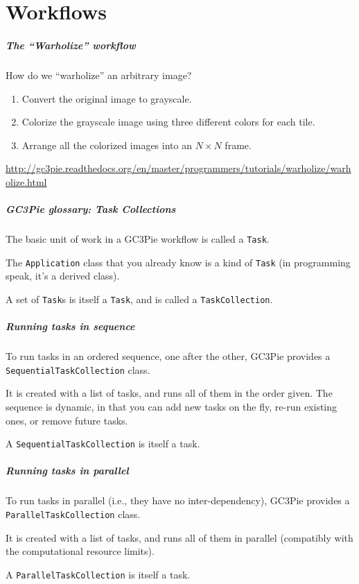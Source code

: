 \documentclass[english,serif,mathserif,usenames,dvipsnames]{beamer}
\begin{document}
\part{Workflows}

\begin{frame}[label=workflows]
  \frametitle{The ``Warholize'' workflow}
How do we ``warholize'' an arbitrary image?

\+
\begin{enumerate}
\item Convert the original image to grayscale.
\item Colorize the grayscale image using three different colors for each tile.
\item Arrange all the colorized images into an $N\times N$ frame.
\end{enumerate}

\+
\begin{references}
  \url{http://gc3pie.readthedocs.org/en/master/programmers/tutorials/warholize/warholize.html}
\end{references}
\end{frame}


\begin{frame}
  \frametitle{GC3Pie glossary: Task Collections}

  The basic unit of work in a GC3Pie workflow is called a \texttt{Task}.

  \+
  The \texttt{Application} class that you already know is a kind of
  \texttt{Task} (in programming speak, it's a derived class).

  \+
  A set of \texttt{Task}s is itself a \texttt{Task}, and is called a \texttt{TaskCollection}.
\end{frame}


\begin{frame}
  \frametitle{Running tasks in sequence}

  To run tasks in an ordered sequence, one after the other, GC3Pie
  provides a \texttt{SequentialTaskCollection} class.

  \+
  It is created with a list of tasks, and runs all of them in the
  order given.  The sequence is dynamic, in that you can add new tasks
  on the fly, re-run existing ones, or remove future tasks.

  \+
  A \texttt{SequentialTaskCollection} is itself a task.
\end{frame}


\begin{frame}
  \frametitle{Running tasks in parallel}

  To run tasks in parallel (i.e., they have no inter-dependency),
  GC3Pie provides a \texttt{ParallelTaskCollection} class.

  \+
  It is created with a list of tasks, and runs all of them
  in parallel (compatibly with the computational resource limits).

  \+
  A \texttt{ParallelTaskCollection} is itself a task.

\end{frame}
\end{document}
